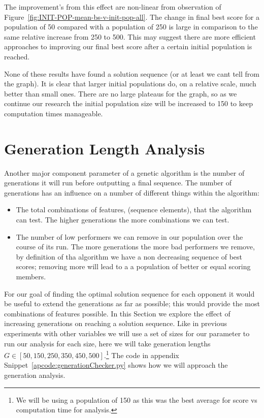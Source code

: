 The improvement's from this effect are non-linear from observation of Figure~\ref{fig:INIT-POP-mean-bs-v-init-pop-all}.
The change in final best score for a population of 50 compared with a population of 250 is large in comparison to the same relative increase from 250 to 500.
This may suggest there are more efficient approaches to improving our final best score after a certain initial population is reached.

None of these results have found a solution sequence (or at least we cant tell from the graph).
It is clear that larger initial populations do, on a relative scale, much better than small ones.
There are no large plateaus for the graph, so as we continue our research the initial population size will be increased to 150 to keep computation times manageable.

\section{Generation Length Analysis}\label{sec:generationlengthanalysis}
Another major component parameter of a genetic algorithm is the number of generations it will run before outputting a final sequence.
The number of generations has an influence on a number of different things within the algorithm:

\begin{itemize}
    \item The total combinations of features, (sequence elements), that the algorithm can test. The higher generations the more combinations we can test.
    \item The number of low performers we can remove in our population over the course of its run. The more generations the more bad performers we remove, by definition of tha algorithm we have a non decreasing sequence of best scores; removing more will lead to a a population of better or equal scoring members. 
\end{itemize}

For our goal of finding the optimal solution sequence for each opponent it would be useful to extend the generations as far as possible;
this would provide the most combinations of features possible.
In this Section we explore the effect of increasing generations on reaching a solution sequence.
Like in previous experiments with other variables we will use a set of sizes for our parameter to run our analysis for each size, here we will take generation lengths \(G \in [50,150,250,350,450,500]\).\footnote{We will be using a population of 150 as this was the best average for score vs computation time for analysis.}
The code in appendix Snippet~\ref{apcode:generationChecker.py} shows how we will approach the generation analysis.

